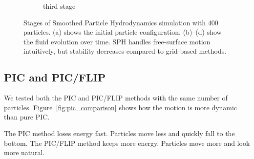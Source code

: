 \begin{figure}[h]
\begin{subfigure}[b]{0.2\textwidth}
        \caption{third stage}
    \end{subfigure}
    \caption{
        Stages of Smoothed Particle Hydrodynamics simulation with 400 particles.
        (a) shows the initial particle configuration.
        (b)–(d) show the fluid evolution over time.
        SPH handles free-surface motion intuitively, but stability decreases compared to grid-based methods.
        }
    \label{fig:sph}
\end{figure}

\subsection{PIC and PIC/FLIP}

We tested both the PIC and PIC/FLIP methods with the same number of particles. Figure~\ref{fig:pic_comparison} shows how the motion is more dynamic than pure PIC.

The PIC method loses energy fast. Particles move less and quickly fall to the bottom.
The PIC/FLIP method keeps more energy. Particles move more and look more natural.

